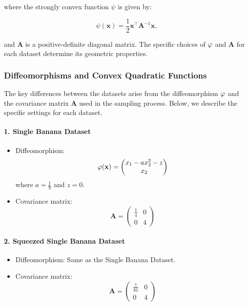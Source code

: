\noindent where the strongly convex function $\psi$ is given by:

\begin{equation}
    \psi(\mathbf{x}) = \frac{1}{2} \mathbf{x}^\top \mathbf{A}^{-1} \mathbf{x},
    \label{eq:quadratic-stroco-ap}
\end{equation}

\noindent and $\mathbf{A}$ is a positive-definite diagonal matrix. The specific choices of $\varphi$ and $\mathbf{A}$ for each dataset determine its geometric properties.

\subsubsection{Diffeomorphisms and Convex Quadratic Functions}

The key differences between the datasets arise from the diffeomorphism $\varphi$ and the covariance matrix $\mathbf{A}$ used in the sampling process. Below, we describe the specific settings for each dataset.

\paragraph{1. Single Banana Dataset}

\begin{itemize}
    \item Diffeomorphism: 
    \[
    \varphi(\mathbf{x}) = \begin{pmatrix} 
    x_1 - a x_2^2 - z \\
    x_2 
    \end{pmatrix}
    \]
    where $a = \frac{1}{9}$ and $z = 0$.
    \item Covariance matrix:
    \[
    \mathbf{A} = \begin{pmatrix} 
    \frac{1}{4} & 0 \\
    0 & 4 
    \end{pmatrix}
    \]
\end{itemize}

\paragraph{2. Squeezed Single Banana Dataset}

\begin{itemize}
    \item Diffeomorphism: Same as the Single Banana Dataset.
    \item Covariance matrix:
    \[
    \mathbf{A} = \begin{pmatrix} 
    \frac{1}{81} & 0 \\
    0 & 4 
    \end{pmatrix}
    \]
\end{itemize}

